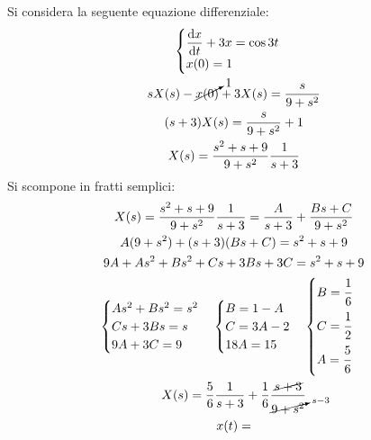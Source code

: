 \documentclass{article}
\newcommand{\df}{\mathrm{d}}
\newcommand{\diff}[2]{\displaystyle\frac{\df{#1}}{\df{#2}}}
\numberwithin{equation}{subsection}
\begin{document}
Si considera la seguente equazione differenziale:
\begin{gather*}
    \begin{cases}
        \diff{x}{t}+3x=\cos3t\\
        x(0)=1
    \end{cases}\\
    sX(s)-\cancelto{1}{x(0)}+3X(s)=\frac{s}{9+s^2}\\
    (s+3)X(s)=\frac{s}{9+s^2}+1\\
    X(s)=\frac{s^2+s+9}{9+s^2}\frac{1}{s+3}
\end{gather*}
Si scompone in fratti semplici:
\begin{gather*}
    X(s)=\frac{s^2+s+9}{9+s^2}\frac{1}{s+3}=\frac{A}{s+3}+\frac{Bs+C}{9+s^2}\\
    A(9+s^2)+(s+3)(Bs+C)=s^2+s+9\\
    9A+As^2+Bs^2+Cs+3Bs+3C=s^2+s+9\\
    \begin{cases}
        As^2+Bs^2=s^2\\
        Cs+3Bs=s\\
        9A+3C=9
    \end{cases}\begin{cases}
        B=1-A\\
        C=3A-2\\
        18A=15
    \end{cases}\begin{cases}
        B=\displaystyle\frac{\strut1}{\strut6}\\
        C=\displaystyle\frac{\strut1}{\strut2}\\
        A=\displaystyle\frac{\strut5}{\strut6}
    \end{cases}\\
    X(s)=\frac{5}{6}\frac{1}{s+3}+\frac{1}{6}\frac{\cancel{s+3}}{\cancelto{s-3}{9+s^2}}\\
    x(t)=
\end{gather*}
\end{document}
